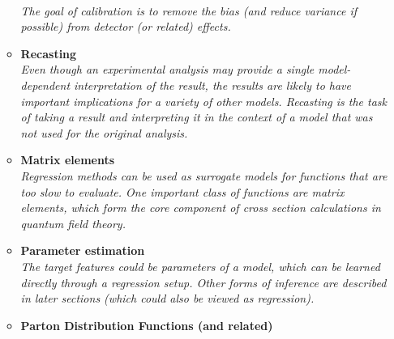 \documentclass[12pt,letterpaper]{article}
\begin{document}
\begin{itemize}
\begin{itemize}
		\\\textit{The goal of calibration is to remove the bias (and reduce variance if possible) from detector (or related) effects.}
		\item \textbf{Recasting}~\cite{Corpe:2025sbw,Goodsell:2024aig,Hammad:2022wpq,1806026,Bertone:2016mdy,Caron:2017hku}
		\\\textit{Even though an experimental analysis may provide a single model-dependent interpretation of the result, the results are likely to have important implications for a variety of other models.  Recasting is the task of taking a result and interpreting it in the context of a model that was not used for the original analysis.}
		\item \textbf{Matrix elements}~\cite{Heimel:2023ngj,Kaidisch:2023lwp,Maitre:2023dqz,Janssen:2023ahv,Badger:2022hwf,Dersy:2022bym,Alnuqaydan:2022ncd,Karl:2022jda,Winterhalder:2021ngy,Danziger:2021eeg,Maitre:2021uaa,Aylett-Bullock:2021hmo,Sombillo:2021rxv,Sombillo:2021yxe,Bury:2020ewi,1804325,Bishara:2019iwh,Badger:2020uow}
		\\\textit{Regression methods can be used as surrogate models for functions that are too slow to evaluate.  One important class of functions are matrix elements, which form the core component of cross section calculations in quantum field theory.}
		\item \textbf{Parameter estimation}~\cite{Vasilev:2025dff,Biro:2024tzv,Simkina:2023ztj,Dubey:2023pro,Yang:2023rbg,Schroder:2023akt,Goos:2023opq,Shi:2023xfz,AlHammal:2023svo,Qiu:2023ihi,Garg:2022tal,Meng:2022lmd,Castro:2022zpq,Craven:2021ems,Alda:2021rgt,Kim:2021pcz,Lazzarin:2020uvv,1808105,Lei:2020ucb}
		\\\textit{The target features could be parameters of a model, which can be learned directly through a regression setup.  Other forms of inference are described in later sections (which could also be viewed as regression).}
		\item \textbf{Parton Distribution Functions (and related)}~\cite{Barontini:2025lnl,Soleymaninia:2025cvi,Cruz-Martinez:2025ahf,Bacchetta:2025ara,Chowdhury:2024ymm,Kriesten:2024are,Liuti:2024umy,Yan:2024yir,Barontini:2024dyb,Ochoa-Oregon:2024zgm,Soleymaninia:2024jam,Bertone:2024taw,Costantini:2024xae,Gombas:2024rvw,DallOlio:2024vjv,NNPDF:2024dpb,NNPDF:2024djq,Kriesten:2023uoi,Rabemananjara:2023xfq,Fernando:2023obn,Wang:2023poi,Kassabov:2023hbm,Wang:2023nab,Candido:2023utz,Gao:2022srd,Gao:2022uhg,Iranipour:2022iak,Khalek:2021gon,Ball:2021xlu,Ball:2021leu,Carrazza:2021hny,Rossi:2020sbh,Grigsby:2020auv,DelDebbio:2020rgv}

\end{itemize}
\end{itemize}
\end{document}
